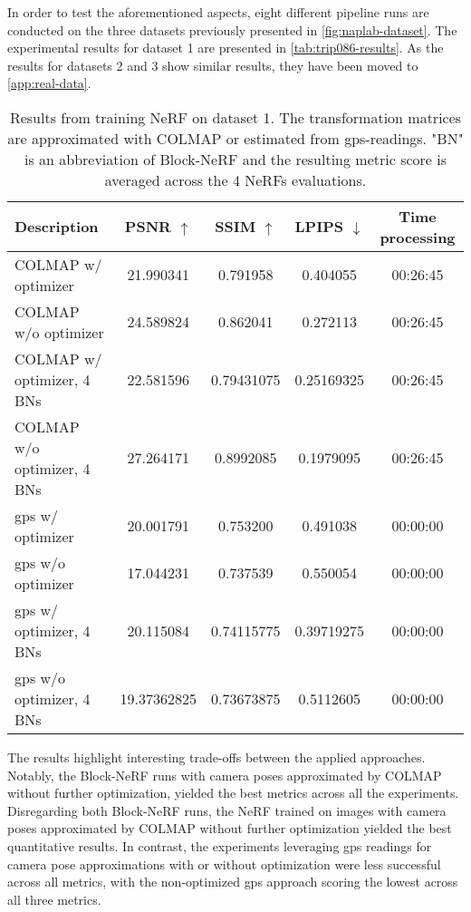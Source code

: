 In order to test the aforementioned aspects, eight different pipeline runs are conducted on the three datasets previously presented in \autoref{fig:naplab-dataset}. The experimental results for dataset 1 are presented in \autoref{tab:trip086-results}. As the results for datasets 2 and 3 show similar results, they have been moved to \autoref{app:real-data}.

\begin{table}[ht]
\centering
\setlength{\tabcolsep}{6pt}
\renewcommand{\arraystretch}{1.5}
\begin{tabular}{l | C{2.2} C{1.3} C{1.3} c}
\hline
\textbf{Description} & \textbf{PSNR $\uparrow$} & \textbf{SSIM $\uparrow$} & \textbf{LPIPS $\downarrow$} & \textbf{Time processing} \\
\hline
COLMAP w/ optimizer           & 21.990341 & 0.791958 & 0.404055         & 00:26:45 \\
COLMAP w/o optimizer          & 24.589824 & 0.862041 & 0.272113         & 00:26:45 \\
COLMAP w/ optimizer, 4 BNs    & 22.581596	& 0.79431075 & 0.25169325   & 00:26:45 \\
COLMAP w/o optimizer, 4 BNs   & 27.264171 & 0.8992085 & 0.1979095       & 00:26:45 \\
\acrshort{gps} w/ optimizer              & 20.001791 & 0.753200 & 0.491038         & 00:00:00 \\
\acrshort{gps} w/o optimizer             & 17.044231 & 0.737539 & 0.550054         & 00:00:00 \\
\acrshort{gps} w/ optimizer, 4 BNs       & 20.115084 & 0.74115775 & 0.39719275     & 00:00:00 \\
\acrshort{gps} w/o optimizer, 4 BNs      & 19.37362825 & 0.73673875 & 0.5112605    & 00:00:00 \\
\hline
\end{tabular}
\caption[Results from experiment 5: Real data]{Results from training NeRF on dataset 1. The transformation matrices are approximated with COLMAP or estimated from \acrshort{gps}-readings. "BN" is an abbreviation of Block-NeRF and the resulting metric score is averaged across the 4 NeRFs evaluations.}
\label{tab:trip086-results}
\end{table}







The results highlight interesting trade-offs between the applied approaches. Notably, the Block-NeRF runs with camera poses approximated by COLMAP without further optimization, yielded the best metrics across all the experiments. Disregarding both Block-NeRF runs, the NeRF trained on images with camera poses approximated by COLMAP without further optimization yielded the best quantitative results. In contrast, the experiments leveraging \acrshort{gps} readings for camera pose approximations with or without optimization were less successful across all metrics, with the non-optimized \acrshort{gps} approach scoring the lowest across all three metrics.


